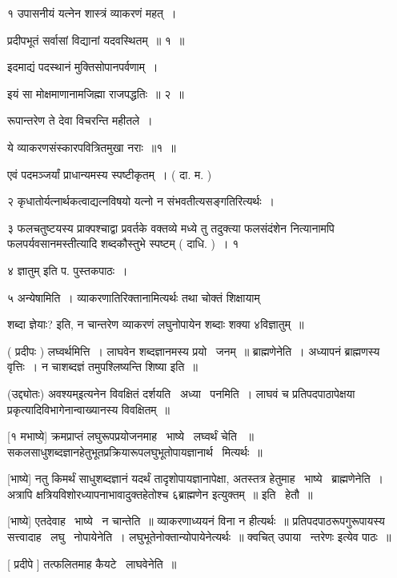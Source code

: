 \documentclass[11pt, openany]{book}
\begin{document}
१ उपासनीयं यत्नेन शास्त्रं व्याकरणं महत्~। 

प्रदीपभूतं सर्वासां विद्यानां यदवस्थितम्~॥ १~॥ 

इदमाद्यं पदस्थानं मुक्तिसोपानपर्वणाम्~। 

इयं सा मोक्षमाणानामजिह्मा राजपद्धतिः~॥ २~॥ 

रूपान्तरेण ते देवा विचरन्ति महीतले~। 

ये व्याकरणसंस्कारपवित्रितमुखा नराः~॥१~॥ 

एवं पदमञ्जर्यां प्राधान्यमस्य स्पष्टीकृतम्~। ( दा. म. ) 

२ कृधातोर्यत्नार्थकत्वाद्यत्नविषयो यत्नो न संभवतीत्यसङ्गतिरित्यर्थः~। 

३ फलचतुष्टयस्य प्राक्पश्चाद्वा प्रवर्तके वक्तव्ये मध्ये तु तदुक्त्या
फलसंदंशेन नित्यानामपि फलपर्यवसानमस्तीत्यादि शब्दकौस्तुभे स्पष्टम् (
दाधि. )~। १ 

४ {\qt ज्ञातुम्} इति प. पुस्तकपाठः~। 

५ अन्येषामिति~। व्याकरणातिरिक्तानामित्यर्थः तथा चोक्तं शिक्षायाम् \textendash\ 





शब्दा ज्ञेयाः? इति, न चान्तरेण व्याकरणं लघुनोपायेन शब्दाः शक्या
४विज्ञातुम्~॥ 

 ( प्रदीपः ) लघ्वर्थमित्ति~। लाघवेन शब्दज्ञानमस्य प्रयो \textendash\ जनम्~॥
ब्राह्मणेनेति~। अध्यापनं ब्राह्मणस्य वृत्तिः~। न चाशब्दज्ञं
तमुपश्लिष्यन्ति शिष्या इति~॥ 

 (उद्द्योतः) {\qt अवश्यम्}इत्यनेन विवक्षितं दर्शयति \textendash\ अध्या \textendash\ पनमिति~। लाघवं
च प्रतिपदपाठापेक्षया प्रकृत्यादिविभागेनान्वाख्यानस्य विवक्षितम्~॥ 



 [१ मभाष्ये] क्रमप्राप्तं लघुरूपप्रयोजनमाह \textendash\ भाष्ये \textendash\ लघ्वर्थं चेति
~॥ सकलसाधुशब्दज्ञानहेतुभूतप्रक्रियारूपलघुभूतोपायज्ञानार्थ \textendash\ मित्यर्थः~॥


 [भाष्ये] नतु किमर्थं साधुशब्दज्ञानं यदर्थं तादृशोपायज्ञानापेक्षा,
अतस्तत्र हेतुमाह \textendash\ भाष्ये \textendash\ ब्राह्मणेनेति~। अत्रापि
क्षत्रियविशोरध्यापनाभावादुक्तहेतोश्च ६{\qt ब्राह्मणेन} इत्युक्तम्~॥
इति \textendash\ हेतौ~॥ 

 [भाष्ये] एतदेवाह \textendash\ भाष्ये \textendash\ न चान्तेति~॥ व्याकरणाध्ययनं विना न
हीत्यर्थः~॥ प्रतिपदपाठरूपगुरूपायस्य सत्त्वादाह \textendash\ लघु \textendash\ नोपायेनेति~। 
लघुभूतेनोक्तान्योपायेनेत्यर्थः~॥ क्वचित् {\qt उपाया} \textendash\ न्तरेणः इत्येव पाठः~॥


 [ प्रदीपे ] तत्फलितमाह कैयटे \textendash\ लाघवेनेति~॥ 
\end{document}
